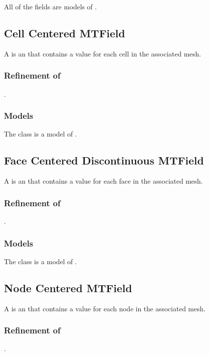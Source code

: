 \documentclass[11pt]{rnote}
\begin{document}
All of the  fields are models of .

\subsection{Cell Centered MTField}

A  is an  that
contains a value for each cell in the associated mesh.

\subsubsection{Refinement of}
.

\subsubsection{Models}

The  class is a model of .

\subsection{Face Centered Discontinuous MTField}

A  is an
 that contains a value for each face in the
associated mesh.

\subsubsection{Refinement of}
.

\subsubsection{Models}

The  class is a model of .

\subsection{Node Centered MTField}

A  is an  that
contains a value for each node in the associated mesh.

\subsubsection{Refinement of}
.
\end{document}
